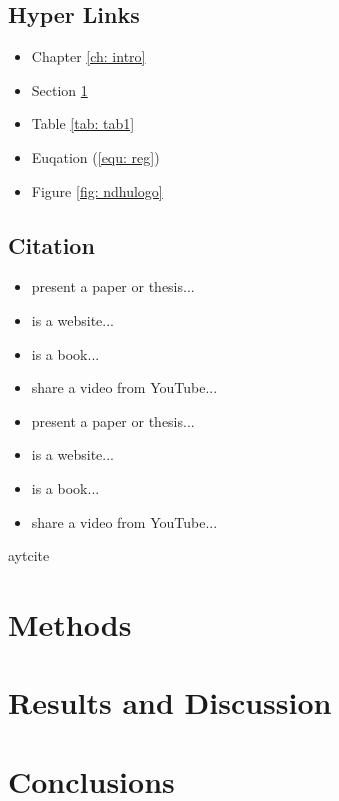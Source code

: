\documentclass[12pt,a4paper,oneside]{book}
\begin{document}
\newpage
\section{Hyper Links}
\label{sec: link}

\begin{itemize}
    \item Chapter \ref{ch: intro}
    \item Section \ref{sec: link}
    \item Table \ref{tab: tab1}
    \item Euqation (\ref{equ: reg})
    \item Figure \ref{fig: ndhulogo}
\end{itemize}

\section{Citation}

\begin{itemize}
    \item \cite{lu2023art} present a paper or thesis...
    \item \cite{lu2023misc} is a website...
    \item \cite{lu2023book} is a book...
    \item \cite{lu2023online} share a video from YouTube...
    \item {} present a paper or thesis...
    \item {} is a website...
    \item {} is a book...
    \item {} share a video from YouTube...
\end{itemize}

aytcite

\chapter{Methods}

\chapter{Results and Discussion}

\chapter{Conclusions}

\newpage

\printbibliography[title={References}, heading=bibintoc]

\newpage

\appendix 
\chapter{}
\end{document}
